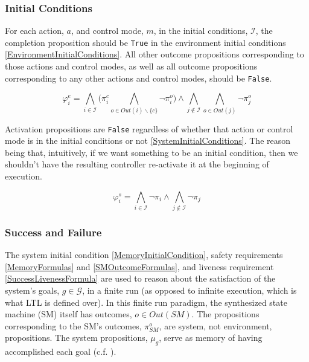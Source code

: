 
\subsubsection{Initial Conditions}

For each action, $a$, and control mode, $m$, in the initial conditions, $\mathcal{I}$, the completion proposition should be \texttt{True} in the environment initial conditions \eqref{EnvironmentInitialConditions}.
All other outcome propositions corresponding to those actions and control modes, as well as all outcome propositions corresponding to any other actions and control modes, should be \texttt{False}.

\begin{equation}\label{EnvironmentInitialConditions}
	\varphi_i^e = \bigwedge \limits_{i \in \mathcal{I}} \Big( \pi_i^c \bigwedge \limits_{o \in Out(i)\backslash \{c\}} \lnot \pi_i^o \Big) \wedge \bigwedge \limits_{j \not\in \mathcal{I}} \bigwedge \limits_{o \in Out(j)} \lnot \pi_j^o
\end{equation}

Activation propositions are \texttt{False} regardless of whether that action or control mode is in the initial conditions or not \eqref{SystemInitialConditions}.
The reason being that, intuitively, if we want something to be an initial condition, then we shouldn't have the resulting controller re-activate it at the beginning of execution.

\begin{equation}\label{SystemInitialConditions}
	\varphi_i^s = \bigwedge \limits_{i \in \mathcal{I}} \lnot \pi_i \wedge \bigwedge \limits_{j \not \in \mathcal{I}} \lnot \pi_j
\end{equation}



\subsubsection{Success and Failure}

The system initial condition \eqref{MemoryInitialCondition}, safety requirements \eqref{MemoryFormulas} and \eqref{SMOutcomeFormulas}, and liveness requirement \eqref{SuccessLivenessFormula} are used to reason about the satisfaction of the system's goals, $g \in \mathcal{G}$, in a finite run (as opposed to infinite execution, which is what LTL is defined over).
In this finite run paradigm, the synthesized state machine (SM) itself has outcomes, $o \in Out(SM)$.
The propositions corresponding to the SM's outcomes, $\pi_{SM}^o$, are system, not environment, propositions.
The system propositions, $\mu_g$, serve as memory of having accomplished each goal (c.f. \cite{Vasu2012IROS}).

